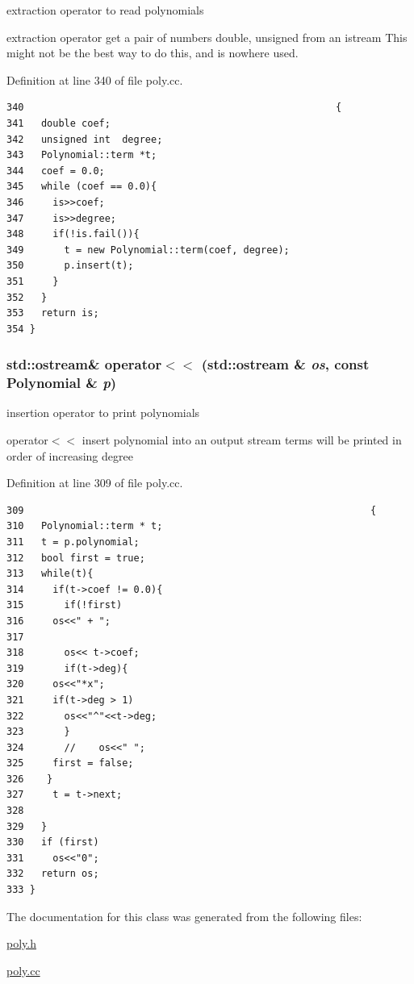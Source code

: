 extraction operator to read polynomials

extraction operator get a pair of numbers double, unsigned from an istream This might not be the best way to do this, and is nowhere used. 

Definition at line 340 of file poly.cc.

\begin{Code}\begin{verbatim}340                                                      {
341   double coef;
342   unsigned int  degree;
343   Polynomial::term *t;
344   coef = 0.0;
345   while (coef == 0.0){
346     is>>coef;
347     is>>degree;
348     if(!is.fail()){
349       t = new Polynomial::term(coef, degree);
350       p.insert(t);
351     }
352   }
353   return is;
354 }
\end{verbatim}
\end{Code}


\hypertarget{classPolynomial_f1fdf53b29100b084772816cb9ecc8ac}{
\subsubsection[operator$<$$<$]{\setlength{\rightskip}{0pt plus 5cm}std::ostream\& operator$<$$<$ (std::ostream \& {\em os}, \/  const {\bf Polynomial} \& {\em p})}}
\label{classPolynomial_f1fdf53b29100b084772816cb9ecc8ac}


insertion operator to print polynomials

operator$<$$<$ insert polynomial into an output stream terms will be printed in order of increasing degree 

Definition at line 309 of file poly.cc.

\begin{Code}\begin{verbatim}309                                                            {
310   Polynomial::term * t;
311   t = p.polynomial;
312   bool first = true;
313   while(t){
314     if(t->coef != 0.0){
315       if(!first)
316     os<<" + ";
317 
318       os<< t->coef;
319       if(t->deg){
320     os<<"*x";
321     if(t->deg > 1)
322       os<<"^"<<t->deg;
323       }
324       //    os<<" ";
325     first = false;
326    }
327     t = t->next;
328 
329   }
330   if (first)
331     os<<"0";
332   return os;
333 }
\end{verbatim}
\end{Code}




The documentation for this class was generated from the following files:\begin{CompactItemize}
\item 
\hyperlink{poly_8h}{poly.h}\item 
\hyperlink{poly_8cc}{poly.cc}\end{CompactItemize}
